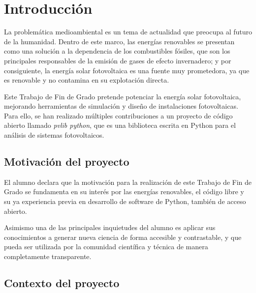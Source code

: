 \chapter{Introducción} \label{chp:intro}

La problemática medioambiental es un tema de actualidad que preocupa al futuro de la humanidad. Dentro de este marco, las energías renovables se presentan como una solución a la dependencia de los combustibles fósiles, que son los principales responsables de la emisión de gases de efecto invernadero; y por consiguiente, la energía solar fotovoltaica es una fuente muy prometedora, ya que es renovable y no contamina en su explotación directa.

Este Trabajo de Fin de Grado pretende potenciar la energía solar fotovoltaica, mejorando herramientas de simulación y diseño de instalaciones fotovoltaicas. Para ello, se han realizado múltiples contribuciones a un proyecto de código abierto llamado \textit{pvlib python}, que es una biblioteca escrita en Python para el análisis de sistemas fotovoltaicos.


\section{Motivación del proyecto} \label{sct:intro:motivacion}

El alumno declara que la motivación para la realización de este Trabajo de Fin de Grado se fundamenta en su interés por las energías renovables, el código libre y su ya experiencia previa en desarrollo de software de Python, también de acceso abierto.

Asimismo una de las principales inquietudes del alumno es aplicar sus conocimientos a generar nueva ciencia de forma accesible y contrastable, y que pueda ser utilizada por la comunidad científica y técnica de manera completamente transparente.


\section{Contexto del proyecto} \label{sct:intro:contexto}

